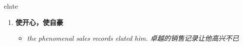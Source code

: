 
\begin{frame}
{\huge elate}
\begin{center}
\begin{enumerate}\Large
  \item \textbf{使开心，使自豪}
  \begin{itemize}
    \item \em{\Large{the phenomenal sales records elated him. 卓越的销售记录让他高兴不已}}
  \end{itemize}
\end{enumerate}
\end{center}
\end{frame}
